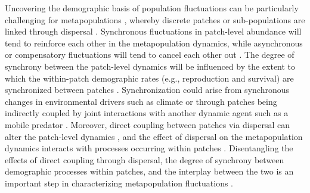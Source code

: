 \documentclass[11pt]{article}
\begin{document}
Uncovering the demographic basis of population fluctuations can be particularly challenging
for metapopulations
\citep{bjornstad1999spatial}, 
whereby discrete patches or sub-populations are linked through dispersal
\citep{hanski1998}.
Synchronous fluctuations in patch-level abundance will tend to reinforce each other 
in the metapopulation dynamics,
while asynchronous or compensatory fluctuations will tend to cancel each other out
\citep{liebhold2004spatial}. 
The degree of synchrony between the patch-level dynamics will be influenced
by the extent to which the within-patch demographic rates 
(e.g., reproduction and survival) are synchronized between patches
\citep{ranta1995synchrony, liebhold2004spatial}.
Synchronization could arise from synchronous changes in environmental
drivers such as climate 
\citep{moran1953}
or through patches being indirectly coupled by joint interactions with another 
dynamic agent such as a mobile predator
\citep{ims2000, gilg2009}. 
Moreover, direct coupling between patches via dispersal can alter the patch-level dynamics
\citep{liebhold2004spatial},
and the effect of dispersal on the metapopulation dynamics interacts 
with processes occurring within patches 
\citep{ranta1995synchrony, kendall2000dispersal, goldwyn2008}.
Disentangling the effects of direct coupling through dispersal, 
the degree of synchrony between demographic processes within patches, 
and the interplay between the two 
is an important step in characterizing metapopulation fluctuations
\citep{liebhold2004spatial, abbott2011}.
\end{document}
